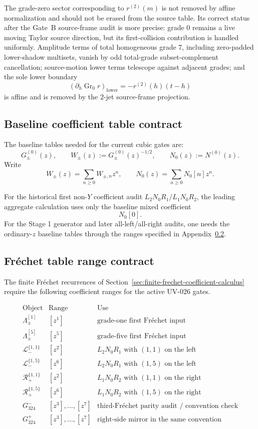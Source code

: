 \documentclass[11pt,a4paper]{amsart}
\theoremstyle{plain}
\theoremstyle{definition}
\begin{document}
The grade-zero sector corresponding to \(r^{(2)}(m)\) is not removed by
affine normalization and should not be erased from the source table.  Its
correct status after the Gate~B source-frame audit is more precise: grade
\(0\) remains a live moving Taylor source direction, but its
first-collision contribution is handled uniformly.  Amplitude terms of
total homogeneous grade \(7\), including zero-padded lower-shadow
multisets, vanish by odd total-grade subset-complement cancellation;
source-motion lower terms telescope against adjacent grades; and the sole
lower boundary
\[
(\partial_h\operatorname{Gr}_{0}r)_{\mathrm{lower}}
=
-r^{(2)}(h)(t-h)
\]
is affine and is removed by the \(2\)-jet source-frame projection.

\subsection{Baseline coefficient table contract}
\label{app:baseline-coefficient-table-contract}

The baseline tables needed for the current cubic gates are:
\[
G_\pm^{(0)}(z),\qquad
W_\pm(z):=G_\pm^{(0)}(z)^{-1/2},
\qquad
N_0(z):=N^{(0)}(z).
\]
Write
\[
W_\pm(z)=\sum_{n\ge0}W_{\pm,n}z^n,
\qquad
N_0(z)=\sum_{n\ge0}N_0[n]z^n.
\]

For the historical first non-\(Y\) coefficient audit
\(L_2N_0R_1/L_1N_0R_2\), the leading aggregate calculation uses only the
baseline mixed coefficient
\[
N_0[0].
\]
For the Stage 1 generator and later all-left/all-right audits, one needs
the ordinary-\(z\) baseline tables through the ranges specified in
Appendix~\ref{app:frechet-table-range-contract}.

\subsection{Fr\'echet table range contract}
\label{app:frechet-table-range-contract}

The finite Fr\'echet recurrences of
Section~\ref{sec:finite-frechet-coefficient-calculus} require the following
coefficient ranges for the active UV-026 gates.

\[
\begin{array}{c|c|c}
\text{Object} & \text{Range} & \text{Use}
\\
\hline
\Lambda_\pm^{[1]} & [z^1] & \text{grade-one first Fr\'echet input}
\\
\Lambda_\pm^{[5]} & [z^5] & \text{grade-five first Fr\'echet input}
\\
\mathcal L_-^{\{1,1\}} & [z^2] &
L_2N_0R_1\text{ with }(1,1)\text{ on the left}
\\
\mathcal L_-^{\{1,5\}} & [z^6] &
L_2N_0R_1\text{ with }(1,5)\text{ on the left}
\\
\mathcal R_+^{\{1,1\}} & [z^2] &
L_1N_0R_2\text{ with }(1,1)\text{ on the right}
\\
\mathcal R_+^{\{1,5\}} & [z^6] &
L_1N_0R_2\text{ with }(1,5)\text{ on the right}
\\
G^-_{324} & [z^3],\ldots,[z^7] &
\text{third-Fr\'echet parity audit / convention check}
\\
G^+_{324} & [z^3],\ldots,[z^7] &
\text{right-side mirror in the same convention}
\end{array}
\]
\end{document}
